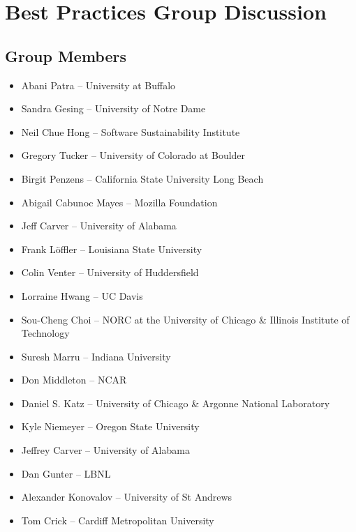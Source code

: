 \section{Best Practices Group Discussion}
\label{sec:appendix_best_practices}


\subsection{Group Members}

\begin{itemize}
\item Abani Patra -- University at Buffalo
\item Sandra Gesing -- University of Notre Dame
\item Neil Chue Hong -- Software Sustainability Institute
\item Gregory Tucker -- University of Colorado at Boulder
\item Birgit Penzens -- California State University Long Beach
\item Abigail Cabunoc Mayes -- Mozilla Foundation
\item Jeff Carver -- University of Alabama
\item Frank L\"{o}ffler -- Louisiana State University 
\item Colin Venter --  University of Huddersfield
\item Lorraine Hwang -- UC Davis 
\item Sou-Cheng Choi -- NORC at the University of Chicago \&  Illinois Institute of Technology
\item Suresh Marru -- Indiana University
\item Don Middleton -- NCAR 
\item Daniel S. Katz --  University of Chicago \& Argonne National Laboratory
\item Kyle Niemeyer -- Oregon State University
\item Jeffrey Carver -- University of Alabama
\item Dan Gunter -- LBNL
\item Alexander Konovalov -- University of St Andrews
\item Tom Crick --  Cardiff Metropolitan University

\end{itemize}


